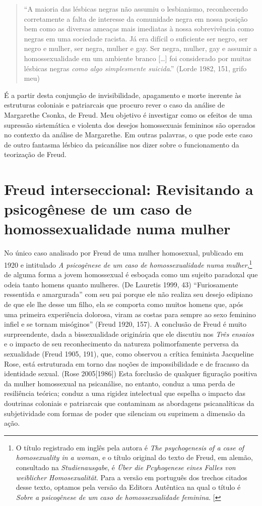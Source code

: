 \begin{quote}
``A maioria das lésbicas negras não assumiu o lesbianismo, reconhecendo
corretamente a falta de interesse da comunidade negra em nossa posição
bem como as diversas ameaças mais imediatas à nossa sobrevivência como
negras em uma sociedade racista. Já era difícil o suficiente ser negro,
ser negro e mulher, ser negra, mulher e gay. Ser negra, mulher, gay e
assumir a homossexualidade em um ambiente branco {[}\ldots{}{]} foi
considerado por muitas lésbicas negras \emph{como algo simplesmente
suicida}.'' (Lorde 1982, 151, grifo meu)
\end{quote}

É a partir desta conjunção de invisibilidade, apagamento e morte
inerente às estruturas coloniais e patriarcais que procuro rever o caso
da análise de Margarethe Csonka, de Freud. Meu objetivo é investigar
como os efeitos de uma supressão sistemática e violenta dos desejos
homossexuais femininos são operados no contexto da análise de
Margarethe. Em outras palavras, o que pode este caso de outro fantasma
lésbico da psicanálise nos dizer sobre o funcionamento da teorização de
Freud.

\section{Freud interseccional: Revisitando a psicogênese de um caso de
homossexualidade numa mulher }

No único caso analisado por Freud de uma mulher homosexual, publicado em
1920 e intitulado \emph{A psicogênese de um caso de homossexualidade
numa mulher},\footnote{O título registrado em inglês pela autora é
  \emph{The psychogenesis of a case of homosexuality in a woman}, e o
  título original do texto de Freud, em alemão, consultado na
  \emph{Studienausgabe}, é \emph{Über die Pcyhogenese eines Falles von
  weiblicher Homosexualität}. Para a versão em português dos trechos
  citados desse texto, optamos pela versão da Editora Autêntica na qual
  o título é \emph{Sobre a psicogênese de um caso de homossexualidade
  feminina}. {[}\versal{N.~T.}{]}} de alguma forma a jovem homossexual é esboçada
como um sujeito paradoxal que odeia tanto homens quanto mulheres. (De
Lauretis 1999, 43) ``Furiosamente ressentida e amargurada'' com seu pai
porque ele não realiza seu desejo edipiano de que ele lhe desse um
filho, ela se comporta como muitos homens que, após uma primeira
experiência dolorosa, viram as costas para sempre ao sexo feminino
infiel e se tornam misóginos'' (Freud 1920, 157). A conclusão de Freud é
muito surpreendente, dada a bissexualidade originária que ele discutiu
nos \emph{Três ensaios} e o impacto de seu reconhecimento da natureza
polimorfamente perversa da sexualidade (Freud 1905, 191), que, como
observou a crítica feminista Jacqueline Rose, está estruturada em torno
das noções de impossibilidade e de fracasso da identidade sexual. (Rose
2005{[}1986{]}) Esta forclusão de qualquer figuração positiva da mulher
homossexual na psicanálise, no entanto, conduz a uma perda de
resiliência teórica; conduz a uma rigidez intelectual que espelha o
impacto das doutrinas coloniais e patriarcais que contaminam as
abordagens psicanalíticas da subjetividade com formas de poder que
silenciam ou suprimem a dimensão da ação.

